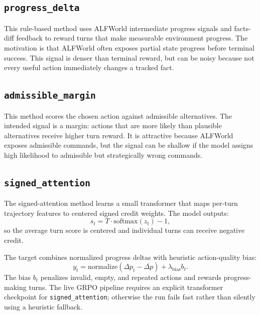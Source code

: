 \documentclass[10pt]{article}
\newcommand{\method}[1]{\texttt{#1}}
\begin{document}
\subsection{\method{progress\_delta}}
This rule-based method uses ALFWorld intermediate progress signals and facts-diff feedback to reward turns that make measurable environment progress. The motivation is that ALFWorld often exposes partial state progress before terminal success. This signal is denser than terminal reward, but can be noisy because not every useful action immediately changes a tracked fact.

\subsection{\method{admissible\_margin}}
This method scores the chosen action against admissible alternatives. The intended signal is a margin: actions that are more likely than plausible alternatives receive higher turn reward. It is attractive because ALFWorld exposes admissible commands, but the signal can be shallow if the model assigns high likelihood to admissible but strategically wrong commands.

\subsection{\method{signed\_attention}}
The signed-attention method learns a small transformer that maps per-turn trajectory features to centered signed credit weights. The model outputs:
\[
    s_t = T\cdot \mathrm{softmax}(z_t) - 1,
\]
so the average turn score is centered and individual turns can receive negative credit.

The target combines normalized progress deltas with heuristic action-quality bias:
\[
    y_t =
    \mathrm{normalize}\left(\Delta p_t - \overline{\Delta p}\right)
    + \lambda_{\mathrm{bias}} b_t.
\]
The bias \(b_t\) penalizes invalid, empty, and repeated actions and rewards progress-making turns. The live GRPO pipeline requires an explicit transformer checkpoint for \method{signed\_attention}; otherwise the run fails fast rather than silently using a heuristic fallback.
\end{document}

